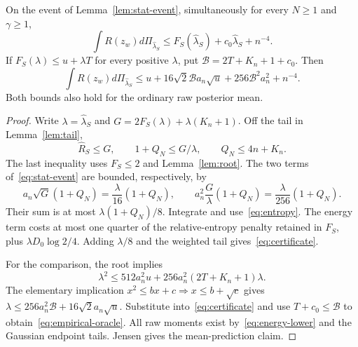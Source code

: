 \begin{theorem}
\label{thm:certificate}
On the event of Lemma~\ref{lem:stat-event}, simultaneously for every $N\ge1$ and $\gamma\ge1$,
\begin{equation}
 \int R(z_w)d\Pi_{\widehat\lambda_S}
 \le F_S(\widehat\lambda_S)+c_0\widehat\lambda_S+n^{-4}.
 \label{eq:certificate}
\end{equation}
If $F_S(\lambda)\le u+\lambda T$ for every positive $\lambda$, put
$\mathcal B=2T+K_n+1+c_0$. Then
\begin{equation}
 \int R(z_w)d\Pi_{\widehat\lambda_S}
 \le u+16\sqrt2\mathcal B a_n\sqrt u+256\mathcal B^2a_n^2+n^{-4}.
 \label{eq:empirical-oracle}
\end{equation}
Both bounds also hold for the ordinary raw posterior mean.
\end{theorem}
\begin{proof}
Write $\lambda=\widehat\lambda_S$ and $G=2F_S(\lambda)+\lambda(K_n+1)$. Off the tail in Lemma~\ref{lem:tail},
\[
 \widehat R_S\le G,\qquad1+Q_N\le G/\lambda,\qquad Q_N\le4n+K_n.
\]
The last inequality uses $F_S\le2$ and Lemma~\ref{lem:root}. The two terms of~\eqref{eq:stat-event} are bounded, respectively, by
\[
 a_n\sqrt G(1+Q_N)=\frac\lambda{16}(1+Q_N),
 \qquad
 a_n^2\frac G\lambda(1+Q_N)=\frac\lambda{256}(1+Q_N).
\]
Their sum is at most $\lambda(1+Q_N)/8$. Integrate and use~\eqref{eq:entropy}. The energy term costs at most one quarter of the relative-entropy penalty retained in $F_S$, plus $\lambda D_0\log2/4$. Adding $\lambda/8$ and the weighted tail gives~\eqref{eq:certificate}.

For the comparison, the root implies
\[
 \lambda^2\le512a_n^2u+256a_n^2(2T+K_n+1)\lambda.
\]
The elementary implication $x^2\le bx+c\Rightarrow x\le b+\sqrt c$ gives
$\lambda\le256a_n^2\mathcal B+16\sqrt2a_n\sqrt u$.
Substitute into~\eqref{eq:certificate} and use $T+c_0\le\mathcal B$ to obtain~\eqref{eq:empirical-oracle}. All raw moments exist by~\eqref{eq:energy-lower} and the Gaussian endpoint tails. Jensen gives the mean-prediction claim.
\end{proof}

